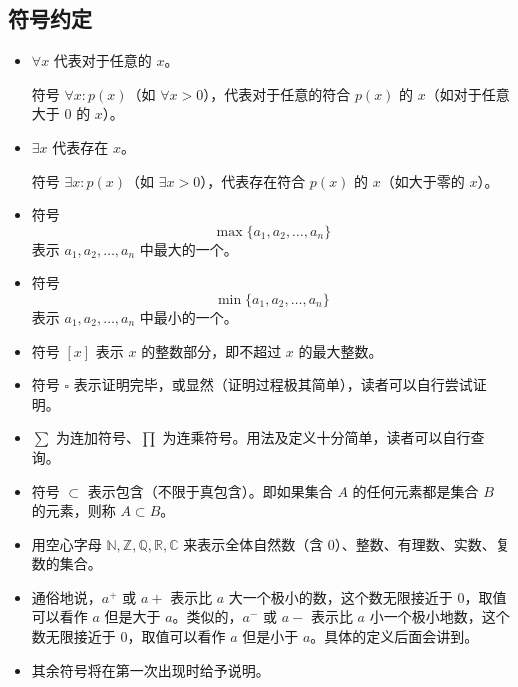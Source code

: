 \documentclass[lang=cn,10pt]{elegantbook}
\begin{document}
\subsection{符号约定}
\begin{itemize}
  \item $\forall x$ 代表对于任意的 $x$。
  
  符号 $\forall x: p(x)$（如 $\forall x>0$），代表对于任意的符合 $p(x)$ 的 $x$（如对于任意大于 $0$ 的 $x$）。
  \item $\exists x$ 代表存在 $x$。
  
  符号 $\exists x: p(x)$（如 $\exists x > 0$），代表存在符合 $p(x)$ 的 $x$（如大于零的 $x$）。
  \item 符号
  \begin{equation*}
    \max\{a_1, a_2, \dots, a_n\}
  \end{equation*}
  表示 $a_1, a_2, \dots, a_n$ 中最大的一个。
  \item 符号
  \begin{equation*}
    \min\{a_1, a_2, \dots, a_n\}
  \end{equation*}
  表示 $a_1, a_2, \dots, a_n$ 中最小的一个。
  \item 符号 $[x]$ 表示 $x$ 的整数部分，即不超过 $x$ 的最大整数。
  \item 符号 $\square$ 表示证明完毕，或显然（证明过程极其简单），读者可以自行尝试证明。
  \item $\sum$ 为连加符号、$\prod$ 为连乘符号。用法及定义十分简单，读者可以自行查询。
  \item 符号 $\subset$ 表示包含（不限于真包含）。即如果集合 $A$ 的任何元素都是集合 $B$ 的元素，则称 $A \subset B$。

  \item 用空心字母 $\mathbb{N, Z, Q, R, C}$ 来表示全体自然数（含 $0$）、整数、有理数、实数、复数的集合。

  \item 通俗地说，$a^+$ 或 $a+$ 表示比 $a$ 大一个极小的数，这个数无限接近于 $0$，取值可以看作 $a$ 但是大于 $a$。类似的，$a^-$ 或 $a-$ 表示比 $a$ 小一个极小地数，这个数无限接近于 $0$，取值可以看作 $a$ 但是小于 $a$。具体的定义后面会讲到。

  \item 其余符号将在第一次出现时给予说明。
\end{itemize}
\end{document}
